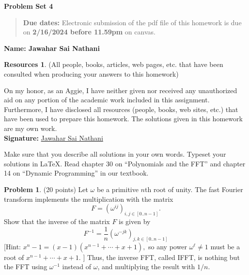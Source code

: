 \documentclass{article}
\theoremstyle{definition}
\newtheorem{problem}{Problem}
\newtheorem*{resources}{Resources}
\newcommand{\name}[1]{\noindent\textbf{Name: #1}}
\newcommand{\honor}{\noindent On my honor, as an Aggie, I have neither
  given nor received any unauthorized aid on any portion of the
  academic work included in this assignment. Furthermore, I have
  disclosed all resources (people, books, web sites, etc.) that have
  been used to prepare this homework. The solutions given in this
  homework are my own work.\\[1ex]
 \textbf{Signature:} \underline{Jawahar Sai Nathani}{\hspace*{5cm}} }
\newcommand{\problemset}[1]{\begin{center}\textbf{Problem Set
      #1}\end{center}}
\newcommand{\duedate}[2]{\begin{quote}\textbf{Due dates:} Electronic
    submission of the pdf file of this homework is due on
    \textbf{#1} on canvas. \end{quote} }
\begin{document}
\problemset{4}
\duedate{2/16/2024 before 11.59pm}{}
\name{Jawahar Sai Nathani}
\begin{resources} (All people, books, articles, web pages, etc. that
  have been consulted when producing your answers to this homework)
\end{resources}
\honor

\newpage
Make sure that you describe all solutions in your own words. Typeset
your solutions in \LaTeX. Read
chapter 30 on ``Polynomials and the FFT'' and chapter 14 on ``Dynamic
Programming'' in our textbook. 

\begin{problem} (20 points) Let $\omega$ be a primitive $n$th root of unity. 
The fast Fourier transform implements the multiplication with
  the matrix 
$$ F = (\omega^{ij})_{i,j\in [0..n-1]}.$$
Show that the inverse of the matrix $F$ is given by 
$$ F^{-1} = \frac{1}{n}  (\omega^{-jk})_{j,k\in [0..n-1]}$$
[Hint: $x^n-1= (x-1)(x^{n-1}+\cdots + x + 1),$ so any power
$\omega^\ell\neq 1$  must be a root of $x^{n-1}+\cdots + x + 1$.  ]  
Thus, the inverse FFT, called IFFT, is nothing but the FFT using
$\omega^{-1}$ instead of $\omega$, and multiplying the result with
$1/n$. 
\end{problem}
\end{document}
